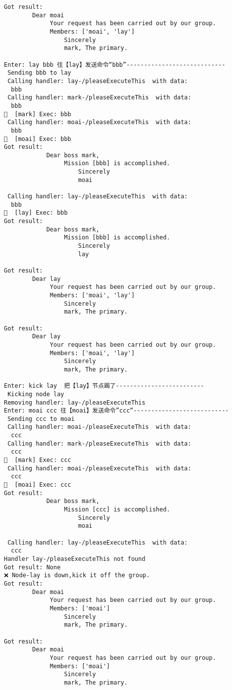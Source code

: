 \begin{verbatim}
Got result: 
        Dear moai
             Your request has been carried out by our group.
             Members: ['moai', 'lay']
                 Sincerely
                 mark, The primary.
         
Enter: lay bbb 往【lay】发送命令“bbb”----------------------------
 Sending bbb to lay 
 Calling handler: lay-/pleaseExecuteThis  with data:
  bbb 
 Calling handler: mark-/pleaseExecuteThis  with data:
  bbb 
🦜  [mark] Exec: bbb 
 Calling handler: moai-/pleaseExecuteThis  with data:
  bbb 
🦜  [moai] Exec: bbb 
Got result: 
            Dear boss mark,
                 Mission [bbb] is accomplished.
                     Sincerely
                     moai
             
 Calling handler: lay-/pleaseExecuteThis  with data:
  bbb 
🦜  [lay] Exec: bbb 
Got result: 
            Dear boss mark,
                 Mission [bbb] is accomplished.
                     Sincerely
                     lay
             
Got result: 
        Dear lay
             Your request has been carried out by our group.
             Members: ['moai', 'lay']
                 Sincerely
                 mark, The primary.
         
Got result: 
        Dear lay
             Your request has been carried out by our group.
             Members: ['moai', 'lay']
                 Sincerely
                 mark, The primary.
         
Enter: kick lay  把【lay】节点踢了-------------------------
 Kicking node lay 
Removing handler: lay-/pleaseExecuteThis
Enter: moai ccc 往【moai】发送命令”ccc“--------------------------- 
 Sending ccc to moai 
 Calling handler: moai-/pleaseExecuteThis  with data:
  ccc 
 Calling handler: mark-/pleaseExecuteThis  with data:
  ccc 
🦜  [mark] Exec: ccc 
 Calling handler: moai-/pleaseExecuteThis  with data:
  ccc 
🦜  [moai] Exec: ccc 
Got result: 
            Dear boss mark,
                 Mission [ccc] is accomplished.
                     Sincerely
                     moai
             
 Calling handler: lay-/pleaseExecuteThis  with data:
  ccc 
Handler lay-/pleaseExecuteThis not found
Got result: None 
❌️ Node-lay is down,kick it off the group.
Got result: 
        Dear moai
             Your request has been carried out by our group.
             Members: ['moai']
                 Sincerely
                 mark, The primary.
         
Got result: 
        Dear moai
             Your request has been carried out by our group.
             Members: ['moai']
                 Sincerely
                 mark, The primary.
         

\end{verbatim}
